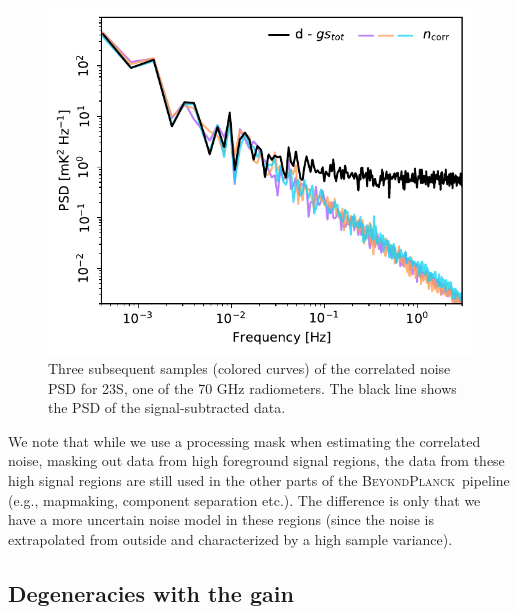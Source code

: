 \documentclass{aa}
\newcommand{\BP}{\textsc{BeyondPlanck}}
\begin{document}
\begin{figure}
        \begin{center}
                \includegraphics[width=\linewidth]{figs/ps_ncorr_samples_new.pdf}
        \end{center}
        \caption{Three subsequent samples (colored curves) of the
          correlated noise PSD for 23S, one of the 70 GHz
          radiometers. The black line shows the PSD of the
          signal-subtracted data.
                \label{fig:ps_samples}}
\end{figure}

We note that while we use a processing mask when estimating the correlated noise, masking out data from high foreground signal regions, the data from these high signal regions are still used in the other parts of the \BP\, pipeline (e.g., mapmaking, component separation etc.). The difference is only that we have a more uncertain noise model in these regions (since the noise is extrapolated from outside and characterized by a high sample variance). 

\subsection{Degeneracies with the gain}
\end{document}
